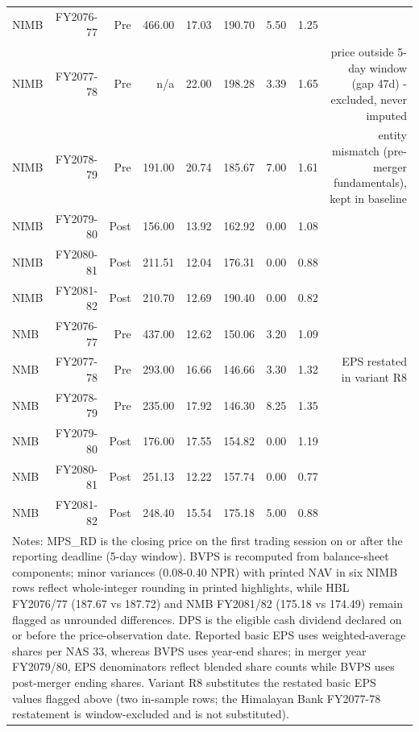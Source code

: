 \begin{table}[htbp]
\begin{tabular}{lrrrrrrrr}
NIMB & FY2076-77 & Pre & 466.00 & 17.03 & 190.70 & 5.50 & 1.25 &  \\
NIMB & FY2077-78 & Pre & n/a & 22.00 & 198.28 & 3.39 & 1.65 & price outside 5-day window (gap 47d) - excluded, never imputed \\
NIMB & FY2078-79 & Pre & 191.00 & 20.74 & 185.67 & 7.00 & 1.61 & entity mismatch (pre-merger fundamentals), kept in baseline \\
NIMB & FY2079-80 & Post & 156.00 & 13.92 & 162.92 & 0.00 & 1.08 &  \\
NIMB & FY2080-81 & Post & 211.51 & 12.04 & 176.31 & 0.00 & 0.88 &  \\
NIMB & FY2081-82 & Post & 210.70 & 12.69 & 190.40 & 0.00 & 0.82 &  \\
NMB & FY2076-77 & Pre & 437.00 & 12.62 & 150.06 & 3.20 & 1.09 &  \\
NMB & FY2077-78 & Pre & 293.00 & 16.66 & 146.66 & 3.30 & 1.32 & EPS restated in variant R8 \\
NMB & FY2078-79 & Pre & 235.00 & 17.92 & 146.30 & 8.25 & 1.35 &  \\
NMB & FY2079-80 & Post & 176.00 & 17.55 & 154.82 & 0.00 & 1.19 &  \\
NMB & FY2080-81 & Post & 251.13 & 12.22 & 157.74 & 0.00 & 0.77 &  \\
NMB & FY2081-82 & Post & 248.40 & 15.54 & 175.18 & 5.00 & 0.88 &  \\
\midrule
\multicolumn{9}{l}{\footnotesize Notes: MPS\_RD is the closing price on the first trading session on or after the reporting deadline (5-day window). BVPS is recomputed from balance-sheet components; minor variances (0.08-0.40 NPR) with printed NAV in six NIMB rows reflect whole-integer rounding in printed highlights, while HBL FY2076/77 (187.67 vs 187.72) and NMB FY2081/82 (175.18 vs 174.49) remain flagged as unrounded differences. DPS is the eligible cash dividend declared on or before the price-observation date. Reported basic EPS uses weighted-average shares per NAS 33, whereas BVPS uses year-end shares; in merger year FY2079/80, EPS denominators reflect blended share counts while BVPS uses post-merger ending shares. Variant R8 substitutes the restated basic EPS values flagged above (two in-sample rows; the Himalayan Bank FY2077-78 restatement is window-excluded and is not substituted).} \\
\bottomrule
\end{tabular}
\end{table}
